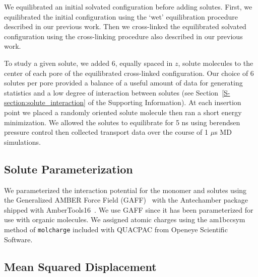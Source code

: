 \documentclass[journal=jpcbfk,manuscript=article]{achemso}
\begin{document}
  We equilibrated an initial solvated configuration before adding solutes. First, we 
  equilibrated the initial configuration using the `wet' equilibration procedure 
  described in our previous work. Then we cross-linked the equilibrated solvated 
  configuration using the cross-linking procedure also described in our previous 
  work.~\cite{coscia_understanding_2019}

  To study a given solute, we added 6, equally spaced in $z$, solute molecules to the
  center of each pore of the equilibrated cross-linked configuration. Our choice of 6
  solutes per pore provided a balance of a useful amount of data for generating 
  statistics and a low degree of interaction between solutes (see 
  Section~\ref{S-section:solute_interaction} of the Supporting Information). At each
  insertion point we placed a randomly oriented solute molecule then ran a short 
  energy minimization. We allowed the solutes to equilibrate for 5 ns using berendsen
  pressure control then collected transport data over the course of 1 $\mu$s MD simulations.
  
  \subsection{Solute Parameterization}\label{method:parameterization}
  
  We parameterized the interaction potential for the monomer and solutes using 
  the Generalized AMBER Force Field (GAFF)~\cite{wang_development_2004} with the
  Antechamber package \cite{wang_automatic_2006} shipped with AmberTools16~\cite{case_ambertools16_2016}.
  We use GAFF since it has been parameterized for use with organic molecules. We
  assigned atomic charges using the am1bccsym method of \texttt{molcharge} included
  with QUACPAC from Openeye Scientific Software.
  
  \subsection{Mean Squared Displacement}\label{method:MSD}
\end{document}
